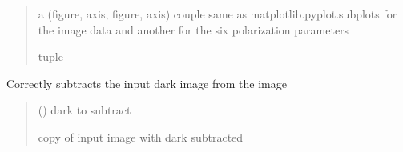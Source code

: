 \documentclass[letterpaper,10pt,english]{sphinxmanual}
\begin{document}
\begin{fulllineitems}
\begin{fulllineitems}
\begin{quote}
\begin{description}
\sphinxAtStartPar
a (figure, axis, figure, axis) couple same as
matplotlib.pyplot.subplots for the image data and another for
the six polarization parameters

\sphinxAtStartPar
tuple

\end{description}\end{quote}

\end{fulllineitems}


\begin{fulllineitems}
\label{\detokenize{micropolarray:micropolarray.micropol_image.MicropolImage.single_pol_subimages}}
\pysigstartsignatures
{}
\pysigstopsignatures
\end{fulllineitems}


\begin{fulllineitems}
\label{\detokenize{micropolarray:micropolarray.micropol_image.MicropolImage.subtract_dark}}
\pysigstartsignatures
{}
\pysigstopsignatures
\sphinxAtStartPar
Correctly subtracts the input dark image from the image
\begin{quote}\begin{description}
\sphinxAtStartPar
{} ({\hyperref[\detokenize{micropolarray:micropolarray.micropol_image.MicropolImage}]{}}) \textendash{} dark to subtract

\sphinxAtStartPar
copy of input image with dark subtracted

\sphinxAtStartPar
{\hyperref[\detokenize{micropolarray:micropolarray.micropol_image.MicropolImage}]{}}

\end{description}\end{quote}

\end{fulllineitems}


\end{fulllineitems}
\end{document}
